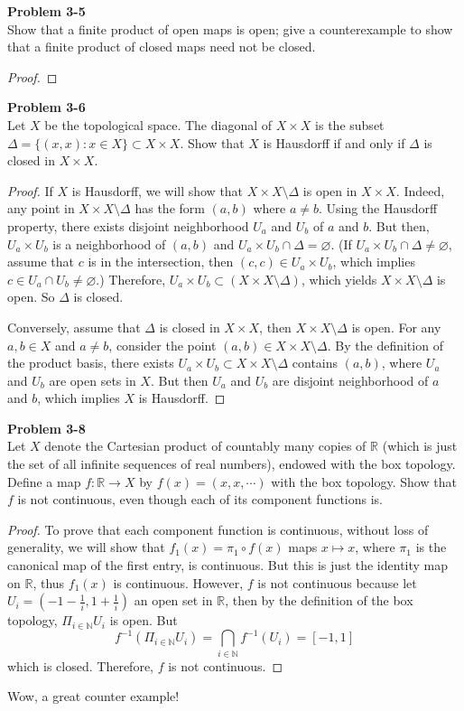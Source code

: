 \documentclass[12pt, a4paper]{article}
\theoremstyle{plain}
\newcommand{\N}{\mathbb{N}}
\newcommand{\R}{\mathbb{R}}
\newenvironment{problem}[2][Problem]
    { \begin{mdframed}[backgroundcolor=gray!20] \textbf{#1 #2} \\}
    {  \end{mdframed}}
\begin{document}
\begin{problem}{3-5}
Show that a finite product of open maps is open; give a counterexample to show that a finite product of closed maps need not be closed.
\end{problem}
	\begin{proof}
	
	\end{proof}
	
\pagebreak

\begin{problem}{3-6}
Let $X$ be the topological space. The diagonal of $X\times X$ is the subset $\Delta=\{(x,x):x\in X\}\subset X\times X$. Show that $X$ is Hausdorff if and only if $\Delta$ is closed in $X\times X$.
\end{problem}
	\begin{proof}
	If $X$ is Hausdorff, we will show that $X\times X\setminus\Delta$ is open in $X\times X$. Indeed, any point in $X\times X\setminus\Delta$ has the form $(a,b)$ where $a\neq b$. Using the Hausdorff property, there exists disjoint neighborhood $U_a$ and $U_b$ of $a$ and $b$. But then, $U_a\times U_b$ is a neighborhood of $(a,b)$ and $U_a\times U_b\cap \Delta=\varnothing$. (If $U_a\times U_b\cap \Delta\neq \varnothing$, assume that $c$ is in the intersection, then $(c,c)\in U_a\times U_b$, which implies $c\in U_a\cap U_b\neq\varnothing$.) Therefore, $U_a\times U_b\subset (X\times X\setminus\Delta)$, which yields $X\times X\setminus\Delta$ is open. So $\Delta$ is closed.
	
	Conversely, assume that $\Delta$ is closed in $X\times X$, then $X\times X\setminus \Delta$ is open. For any $a,b\in X$ and $a\neq b$, consider the point $(a,b)\in X\times X\setminus\Delta$. By the definition of the product basis, there exists $U_a\times U_b\subset X\times X\setminus \Delta$ contains $(a,b)$, where $U_a$ and $U_b$ are open sets in $X$. But then $U_a$ and $U_b$ are disjoint neighborhood of $a$ and $b$, which implies $X$ is Hausdorff.
	\end{proof}

\begin{problem}{3-8}
Let $X$ denote the Cartesian product of countably many copies of $\R$ (which is just the set of all infinite sequences of real numbers), endowed with the box topology. Define a map $f:\R\rightarrow X$ by $f(x)=(x,x,\cdots)$ with the box topology. Show that $f$ is not continuous, even though each of its component functions is.
\end{problem}
	\begin{proof}
	To prove that each component function is continuous, without loss of generality, we will show that $f_1(x)=\pi_1\circ f(x)$ maps $x\mapsto x$, where $\pi_1$ is the canonical map of the first entry, is continuous. But this is just the identity map on $\R$, thus $f_1(x)$ is continuous. However, $f$ is not continuous because let $U_i=(-1-\frac{1}{i},1+\frac{1}{i})$ an open set in $\R$, then by the definition of the box topology, $\Pi_{i\in \N}U_i$ is open. But
	\[
	f^{-1}(\Pi_{i\in \N}U_i)=\bigcap_{i\in\N}f^{-1}(U_i)=[-1,1]
	\]
	which is closed. Therefore, $f$ is not continuous. 
	\end{proof}
	Wow, a great counter example!
\pagebreak
\end{document}
